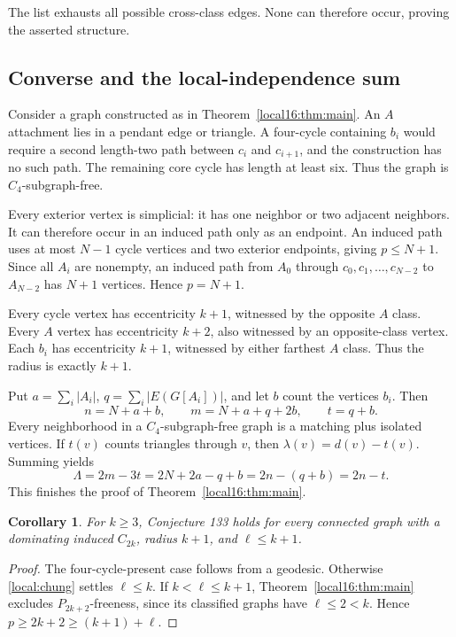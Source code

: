 \documentclass[11pt,a4paper]{article}
\newtheorem{corollary}[theorem]{Corollary}
\theoremstyle{definition}\newtheorem{definition}[theorem]{Definition}
\theoremstyle{remark}\newtheorem{remark}[theorem]{Remark}
\begin{document}
The list exhausts all possible cross-class edges. None can therefore
occur, proving the asserted structure.

\subsection{Converse and the local-independence sum}
Consider a graph constructed as in Theorem~\ref{local16:thm:main}. An $A$
attachment lies in a pendant edge or triangle. A four-cycle containing
$b_i$ would require a second length-two path between $c_i$ and $c_{i+1}$,
and the construction has no such path. The remaining core cycle has
length at least six. Thus the graph is $C_4$-subgraph-free.

Every exterior vertex is simplicial: it has one neighbor or two adjacent
neighbors. It can therefore occur in an induced path only as an endpoint.
An induced path uses at most $N-1$ cycle vertices and two exterior
endpoints, giving $p\le N+1$. Since all $A_i$ are nonempty, an induced
path from $A_0$ through $c_0,c_1,\ldots,c_{N-2}$ to $A_{N-2}$ has
$N+1$ vertices. Hence $p=N+1$.

Every cycle vertex has eccentricity $k+1$, witnessed by the opposite
$A$ class. Every $A$ vertex has eccentricity $k+2$, also witnessed by an
opposite-class vertex. Each $b_i$ has eccentricity $k+1$, witnessed by
either farthest $A$ class. Thus the radius is exactly $k+1$.

Put $a=\sum_i|A_i|$, $q=\sum_i|E(G[A_i])|$, and let $b$ count the
vertices $b_i$. Then
\[
 n=N+a+b,\qquad m=N+a+q+2b,\qquad t=q+b.
\]
Every neighborhood in a $C_4$-subgraph-free graph is a matching plus
isolated vertices. If $t(v)$ counts triangles through $v$, then
$\lambda(v)=d(v)-t(v)$. Summing yields
\[
 \Lambda=2m-3t=2N+2a-q+b=2n-(q+b)=2n-t.
\]
This finishes the proof of Theorem~\ref{local16:thm:main}.



\begin{corollary}\label{local16:cor:wow}
For $k\ge3$, Conjecture 133 holds for every connected graph with a
dominating induced $C_{2k}$, radius $k+1$, and $\ell\le k+1$.
\end{corollary}
\begin{proof}
The four-cycle-present case follows from a geodesic. Otherwise
\eqref{local:chung} settles $\ell\le k$. If $k<\ell\le k+1$,
Theorem~\ref{local16:thm:main} excludes $P_{2k+2}$-freeness, since its
classified graphs have $\ell\le2<k$. Hence
$p\ge2k+2\ge(k+1)+\ell$.
\end{proof}
\end{document}
